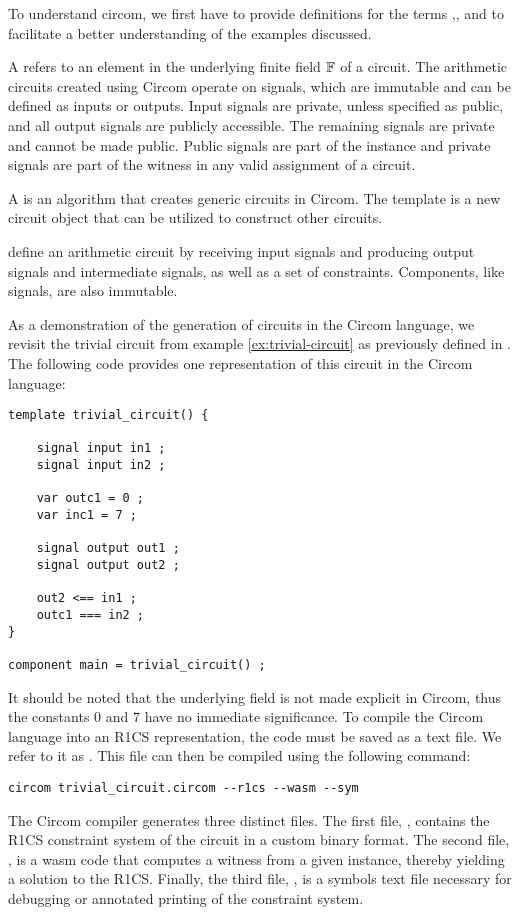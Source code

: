 To understand circom, we first have to provide definitions for the terms ,, and  to facilitate a better understanding of the examples discussed.

A  refers to an element in the underlying finite field $\mathbb{F}$ of a circuit. The arithmetic circuits created using Circom operate on signals, which are immutable and can be defined as inputs or outputs. Input signals are private, unless specified as public, and all output signals are publicly accessible. The remaining signals are private and cannot be made public. Public signals are part of the instance and private signals are part of the witness in any valid assignment of a circuit.

A  is an algorithm that creates generic circuits in Circom. The template is a new circuit object that can be utilized to construct other circuits.

 define an arithmetic circuit by receiving input signals and producing output signals and intermediate signals, as well as a set of constraints. Components, like signals, are also immutable.

\begin{example}
\label{ex:trivial-circuit-circom}
As a demonstration of the generation of circuits in the Circom language, we revisit the trivial circuit from example \ref{ex:trivial-circuit} as previously defined in . The following code provides one representation of this circuit in the Circom language:

\begin{lstlisting}
template trivial_circuit() {

    signal input in1 ;
    signal input in2 ;

    var outc1 = 0 ;
    var inc1 = 7 ;
    
    signal output out1 ;
    signal output out2 ;

    out2 <== in1 ;
    outc1 === in2 ;
}

component main = trivial_circuit() ;
\end{lstlisting}

It should be noted that the underlying field is not made explicit in Circom, thus the constants $0$ and $7$ have no immediate significance. To compile the Circom language into an R1CS representation, the code must be saved as a text file. We refer to it as . This file can then be compiled using the following command:
\begin{lstlisting}
circom trivial_circuit.circom --r1cs --wasm --sym
\end{lstlisting}

The Circom compiler generates three distinct files. The first file, , contains the R1CS constraint system of the circuit in a custom binary format. The second file, , is a wasm code that computes a witness from a given instance, thereby yielding a solution to the R1CS. Finally, the third file, , is a symbols text file necessary for debugging or annotated printing of the constraint system.
\end{example}

